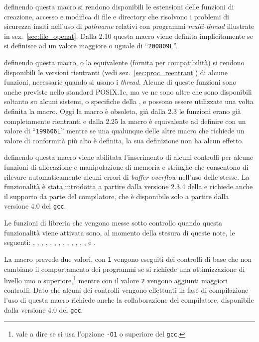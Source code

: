 \begin{basedescript}{\desclabelwidth{2.7cm}\desclabelstyle{\nextlinelabel}}
\item[\macrod{\_ATFILE\_SOURCE}] definendo questa macro si rendono disponibili
  le estensioni delle funzioni di creazione, accesso e modifica di file e
  directory che risolvono i problemi di sicurezza insiti nell'uso di
  \textit{pathname} relativi con programmi \textit{multi-thread} illustrate in
  sez.~\ref{sec:file_openat}. Dalla  2.10 questa macro viene
  definita implicitamente se si definisce  ad un
  valore maggiore o uguale di ``\texttt{200809L}''.

\item[\macrod{\_REENTRANT}] definendo questa macro, o la equivalente
   (fornita per compatibilità) si rendono disponibili
  le versioni rientranti (vedi sez.~\ref{sec:proc_reentrant}) di alcune
  funzioni, necessarie quando si usano i \textit{thread}.  Alcune di queste
  funzioni sono anche previste nello standard POSIX.1c, ma ve ne sono altre
  che sono disponibili soltanto su alcuni sistemi, o specifiche della
  , e possono essere utilizzate una volta definita la macro. Oggi
  la macro è obsoleta, già dalla  2.3 le funzioni erano già
  completamente rientranti e dalla  2.25 la macro è equivalente ad
  definire  con un valore di ``\texttt{199606L}''
  mentre se una qualunque delle altre macro che richiede un valore di
  conformità più alto è definita, la sua definizione non ha alcun effetto.

\item[\macrod{\_FORTIFY\_SOURCE}] definendo questa macro viene abilitata
  l'inserimento di alcuni controlli per alcune funzioni di allocazione e
  manipolazione di memoria e stringhe che consentono di rilevare
  automaticamente alcuni errori di \textit{buffer overflow} nell'uso delle
  stesse. La funzionalità è stata introdotta a partire dalla versione 2.3.4
  della  e richiede anche il supporto da parte del compilatore, che
  è disponibile solo a partire dalla versione 4.0 del \texttt{gcc}.

  Le funzioni di libreria che vengono messe sotto controllo quando questa
  funzionalità viene attivata sono, al momento della stesura di queste note,
  le seguenti: , , ,
  , , , ,
  , , , ,
  , , e .

  La macro prevede due valori, con \texttt{1} vengono eseguiti dei controlli
  di base che non cambiano il comportamento dei programmi se si richiede una
  ottimizzazione di livello uno o superiore,\footnote{vale a dire se si usa
    l'opzione \texttt{-O1} o superiore del \texttt{gcc}.}  mentre con il
  valore \texttt{2} vengono aggiunti maggiori controlli. Dato che alcuni dei
  controlli vengono effettuati in fase di compilazione l'uso di questa macro
  richiede anche la collaborazione del compilatore, disponibile dalla
  versione 4.0 del \texttt{gcc}.

\end{basedescript}

